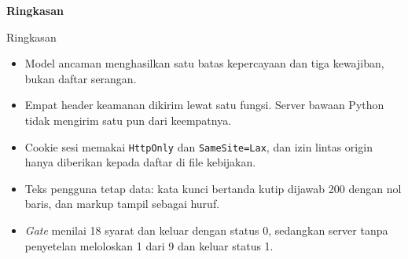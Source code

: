 \documentclass[aspectratio=169, table, 12pt]{beamer}
\begin{document}
\begin{frame}{\hfill}
  \centering
  \Huge{\textbf{Ringkasan}}
\end{frame}

\begin{frame}{{\Large Ringkasan}}
  \vspace{8pt}
  \begin{itemize}
    \item Model ancaman menghasilkan satu batas kepercayaan dan tiga
          kewajiban, bukan daftar serangan.
    \item Empat header keamanan dikirim lewat satu fungsi. Server bawaan
          Python tidak mengirim satu pun dari keempatnya.
    \item Cookie sesi memakai \texttt{HttpOnly} dan \texttt{SameSite=Lax},
          dan izin lintas origin hanya diberikan kepada daftar di file
          kebijakan.
    \item Teks pengguna tetap data: kata kunci bertanda kutip dijawab 200
          dengan nol baris, dan markup tampil sebagai huruf.
    \item \textit{Gate} menilai 18 syarat dan keluar dengan status 0, sedangkan
          server tanpa penyetelan meloloskan 1 dari 9 dan keluar status 1.
  \end{itemize}
\end{frame}
\end{document}
